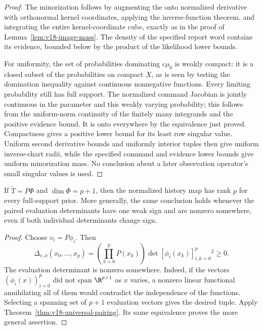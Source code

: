 \begin{proof}
The minorization follows by augmenting the onto normalized derivative
with orthonormal kernel coordinates, applying the inverse-function
theorem, and integrating the entire kernel-coordinate cube, exactly as
in the proof of Lemma~\ref{lem:v18-image-mass}. The density of the
specified report word contains its evidence, bounded below by the
product of the likelihood lower bounds.

For uniformity, the set of probabilities dominating $c\mu_0$ is weakly
compact: it is a closed subset of the probabilities on compact $X$,
as is seen by testing the domination inequality against continuous
nonnegative functions. Every limiting probability still has full
support. The normalized command Jacobian is jointly continuous in the
parameter and this weakly varying probability; this follows from the
uniform-norm continuity of the finitely many integrands and the positive
evidence bound. It is onto everywhere by the equivalence just proved.
Compactness gives a positive lower bound for its least row singular
value. Uniform second derivative bounds and uniformly interior tuples
then give uniform inverse-chart radii, while the specified command and
evidence lower bounds give uniform minorization mass. No conclusion
about a later observation operator's small singular values is used.
\end{proof}

\begin{corollary}
\label{cor:v18-matched-spaces}
If $\widetilde T=P\Phi$ and $\dim\Phi=p+1$, then the normalized
history map has rank $p$ for every full-support prior. More generally,
the same conclusion holds whenever the paired evaluation determinants
have one weak sign and are nonzero somewhere, even if both individual
determinants change sign.
\end{corollary}
\begin{proof}
Choose $v_i=P\phi_i$. Then
\[
 \Delta_{v,\phi}(x_0,\ldots,x_p)
   =\left(\prod_{k=0}^pP(x_k)\right)
     \det[\phi_i(x_k)]_{i,k=0}^p{}^2\ge0.
\]
The evaluation determinant is nonzero somewhere. Indeed, if the
vectors $(\phi_i(x))_{i=0}^p$ did not span $\R^{p+1}$ as $x$ varies,
a nonzero linear functional annihilating all of them would contradict
the independence of the functions. Selecting a spanning set of $p+1$
evaluation vectors gives the desired tuple. Apply
Theorem~\ref{thm:v18-universal-pairing}. Its same equivalence proves
the more general assertion.
\end{proof}

